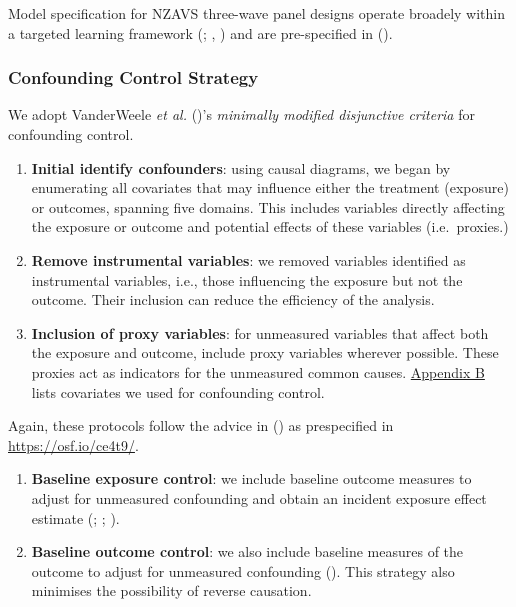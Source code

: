 \documentclass[
  singlecolumn]{article}
\begin{document}
Model specification for NZAVS three-wave panel designs operate broadely
within a targeted learning framework (; , ) and are pre-specified in
().

\subsubsection{Confounding Control
Strategy}\label{confounding-control-strategy}

We adopt VanderWeele \emph{et al.}
()'s \emph{minimally modified
disjunctive criteria} for confounding control.

\begin{enumerate}
\def\labelenumi{\arabic{enumi}.}
\item
  \textbf{Initial identify confounders}: using causal diagrams, we began
  by enumerating all covariates that may influence either the treatment
  (exposure) or outcomes, spanning five domains. This includes variables
  directly affecting the exposure or outcome and potential effects of
  these variables (i.e.~proxies.)
\item
  \textbf{Remove instrumental variables}: we removed variables
  identified as instrumental variables, i.e., those influencing the
  exposure but not the outcome. Their inclusion can reduce the
  efficiency of the analysis.
\item
  \textbf{Inclusion of proxy variables}: for unmeasured variables that
  affect both the exposure and outcome, include proxy variables wherever
  possible. These proxies act as indicators for the unmeasured common
  causes. \hyperref[appendix-demographics]{Appendix B} lists covariates
  we used for confounding control.
\end{enumerate}

Again, these protocols follow the advice in
() as prespecified in
\url{https://osf.io/ce4t9/}.

\begin{enumerate}
\def\labelenumi{\arabic{enumi}.}
\setcounter{enumi}{3}
\item
  \textbf{Baseline exposure control}: we include baseline outcome
  measures to adjust for unmeasured confounding and obtain an incident
  exposure effect estimate (; ;
  ).
\item
  \textbf{Baseline outcome control}: we also include baseline measures
  of the outcome to adjust for unmeasured confounding
  (). This
  strategy also minimises the possibility of reverse causation.
\end{enumerate}
\end{document}
